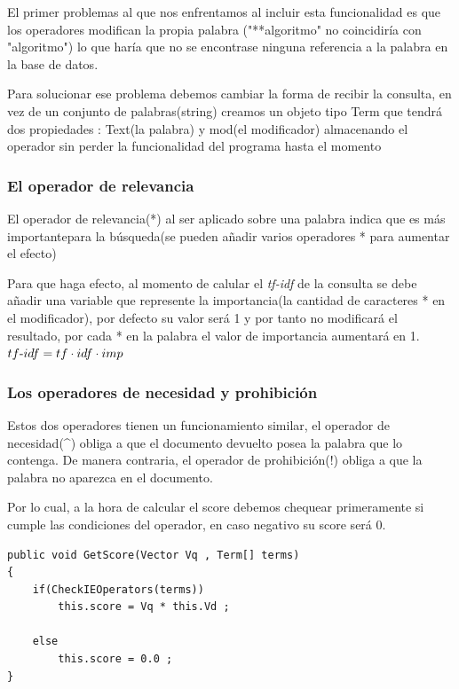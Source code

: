 \documentclass{article}
\begin{document}
El primer problemas al que nos enfrentamos al incluir esta funcionalidad es que los operadores modifican la propia palabra
("**algoritmo" no coincidiría con "algoritmo") lo que haría que no se encontrase ninguna referencia a la palabra en la base de datos.

Para solucionar ese problema debemos cambiar la forma de recibir la consulta, en vez de un conjunto de palabras(string) creamos un objeto
tipo Term que tendrá dos propiedades : Text(la palabra) y mod(el modificador) almacenando el operador sin perder la funcionalidad del programa 
hasta el momento

\subsubsection{El operador de relevancia}
El operador de relevancia(*) al ser aplicado sobre una palabra indica que es más importantepara la búsqueda(se pueden añadir varios operadores * para
aumentar el efecto)

Para que haga efecto, al momento de calular el \textit{tf-idf} de la consulta se debe añadir una variable que represente la importancia(la cantidad de caracteres * en 
el modificador), por defecto su valor será 1 y por tanto no modificará el resultado, por cada * en la palabra el valor de
importancia aumentará en 1. \\[1pt]

$tf\textup{-}idf = tf \cdot idf \cdot imp$ \\[10pt]

\subsubsection{Los operadores de necesidad y prohibición}
Estos dos operadores tienen un funcionamiento similar, el operador de necesidad(\textasciicircum) obliga a que el documento devuelto posea la palabra que lo contenga.
De manera contraria, el operador de prohibición(!) obliga a que la palabra no aparezca en el documento.

Por lo cual, a la hora de calcular el score debemos chequear primeramente si cumple las condiciones del operador, en caso negativo su score será 0.
\\[5pt]

\begin{lstlisting}[language={[Sharp]C}]
public void GetScore(Vector Vq , Term[] terms)
{
    if(CheckIEOperators(terms))
        this.score = Vq * this.Vd ;
        
    else
        this.score = 0.0 ; 
}
\end{lstlisting}
\end{document}
